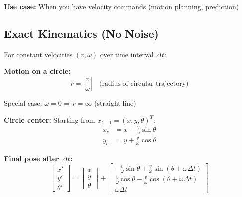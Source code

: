 \textbf{Use case:} When you have velocity commands (motion planning, prediction)

\subsection{Exact Kinematics (No Noise)}

For constant velocities $(v, \omega)$ over time interval $\Delta t$:

\textbf{Motion on a circle:}
\begin{equation}
r = \left|\frac{v}{\omega}\right| \quad \text{(radius of circular trajectory)}
\end{equation}

Special case: $\omega = 0 \Rightarrow r = \infty$ (straight line)

\textbf{Circle center:} Starting from $x_{t-1} = (x, y, \theta)^T$:
\begin{align}
x_c &= x - \frac{v}{\omega}\sin\theta \\
y_c &= y + \frac{v}{\omega}\cos\theta
\end{align}

\textbf{Final pose after $\Delta t$:}
\begin{equation}
\boxed{
\begin{bmatrix} x' \\ y' \\ \theta' \end{bmatrix} =
\begin{bmatrix} x \\ y \\ \theta \end{bmatrix} +
\begin{bmatrix}
-\frac{v}{\omega}\sin\theta + \frac{v}{\omega}\sin(\theta + \omega\Delta t) \\
\frac{v}{\omega}\cos\theta - \frac{v}{\omega}\cos(\theta + \omega\Delta t) \\
\omega\Delta t
\end{bmatrix}
}
\label{eq:ideal_velocity_motion}
\end{equation}

